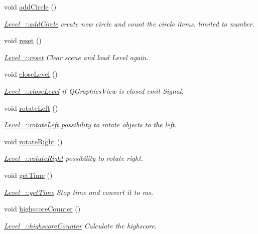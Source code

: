 \begin{DoxyCompactItemize}
void \hyperlink{class_level__1_a1dee4bbb2dffb25a324fded0e50e47cb}{add\+Circle} ()
\begin{DoxyCompactList}\small\item\em \hyperlink{class_level__1_a1dee4bbb2dffb25a324fded0e50e47cb}{Level\+\_\+::add\+Circle} create new circle and count the circle items. limited to number. \end{DoxyCompactList}\item 
void \hyperlink{class_level__1_ac8dc0a81168620b78aea1fb39b449a7f}{reset} ()
\begin{DoxyCompactList}\small\item\em \hyperlink{class_level__1_ac8dc0a81168620b78aea1fb39b449a7f}{Level\+\_\+::reset} Clear scene and load Level again. \end{DoxyCompactList}\item 
void \hyperlink{class_level__1_af17fff3abb47ed9759df00d40a37dcc9}{close\+Level} ()
\begin{DoxyCompactList}\small\item\em \hyperlink{class_level__1_af17fff3abb47ed9759df00d40a37dcc9}{Level\+\_\+::close\+Level} if Q\+Graphics\+View is closed emit Signal. \end{DoxyCompactList}\item 
void \hyperlink{class_level__1_ac214f4650ce42e7fa28834a6a95c4986}{rotate\+Left} ()
\begin{DoxyCompactList}\small\item\em \hyperlink{class_level__1_ac214f4650ce42e7fa28834a6a95c4986}{Level\+\_\+::rotate\+Left} possibility to rotate objects to the left. \end{DoxyCompactList}\item 
void \hyperlink{class_level__1_ac28b3fe439dd840e3a37ab8132f94782}{rotate\+Right} ()
\begin{DoxyCompactList}\small\item\em \hyperlink{class_level__1_ac28b3fe439dd840e3a37ab8132f94782}{Level\+\_\+::rotate\+Right} possibility to rotate right. \end{DoxyCompactList}\item 
void \hyperlink{class_level__1_a9614a513f31c3a76a892af6d88821e7b}{get\+Time} ()
\begin{DoxyCompactList}\small\item\em \hyperlink{class_level__1_a9614a513f31c3a76a892af6d88821e7b}{Level\+\_\+::get\+Time} Stop time and convert it to ms. \end{DoxyCompactList}\item 
void \hyperlink{class_level__1_a2ac0de1428934d30d1b62d2c01aba04f}{highscore\+Counter} ()
\begin{DoxyCompactList}\small\item\em \hyperlink{class_level__1_a2ac0de1428934d30d1b62d2c01aba04f}{Level\+\_\+::highscore\+Counter} Calculate the highscore. \end{DoxyCompactList}\end{DoxyCompactItemize}
